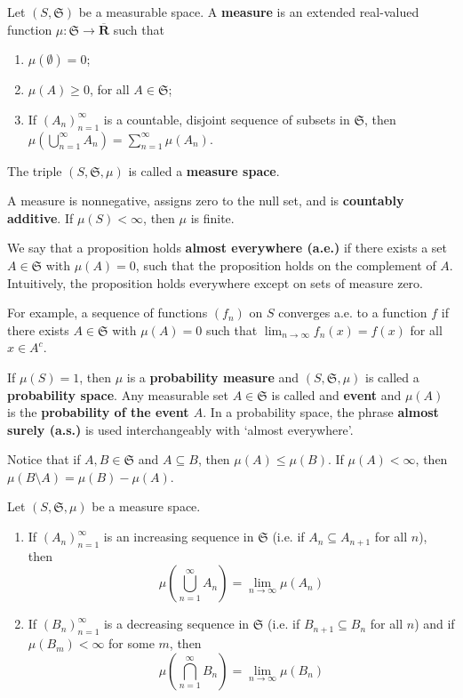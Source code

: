 \begin{definition}
	Let $(S, \mathfrak{S})$ be a measurable space. A \textbf{measure} is an extended real-valued function $\mu : \mathfrak{S} \longrightarrow \overline{\textbf{R}}$ such that 
	\begin{enumerate}
		\item $\mu ( \emptyset ) = 0$;
		\item $\mu(A) \geq 0$, for all $A \in \mathfrak{S}$;
		\item If $(A_n)_{n=1}^\infty$ is a countable, disjoint sequence of subsets in $\mathfrak{S}$, then $\mu(\bigcup_{n=1}^\infty A_n) = \sum_{n=1}^\infty \mu(A_n)$.
	\end{enumerate}

	The triple $(S, \mathfrak{S}, \mu)$ is called a \textbf{measure space}.
\end{definition}

A measure is nonnegative, assigns zero to the null set, and is \textbf{countably additive}. If $\mu(S) < \infty$, then $\mu$ is finite.

We say that a proposition holds \textbf{almost everywhere (a.e.)} if there exists a set $A \in \mathfrak{S}$ with $\mu(A) = 0$, such that the proposition holds on the complement of $A$. Intuitively, the proposition holds everywhere except on sets of measure zero.

For example, a sequence of functions $(f_n)$ on $S$ converges a.e. to a function $f$ if there exists $A \in \mathfrak{S}$ with $\mu(A) = 0$ such that $\lim_{n \to \infty} f_n(x) = f(x)$ for all $x \in A^c$.

If $\mu(S) = 1$, then $\mu$ is a \textbf{probability measure} and $(S, \mathfrak{S}, \mu)$ is called a \textbf{probability space}. Any measurable set $A \in \mathfrak{S}$ is called and \textbf{event} and $\mu(A)$ is the \textbf{probability of the event $A$}. In a probability space, the phrase \textbf{almost surely (a.s.)} is used interchangeably with `almost everywhere'.

Notice that if $A, B \in \mathfrak{S}$ and $A \subseteq B$, then $\mu(A) \leq \mu(B)$. If $\mu(A) < \infty$, then $\mu(B \setminus A) = \mu(B) - \mu(A)$.

\begin{theorem}
	Let $(S, \mathfrak{S}, \mu)$ be a measure space.
	\begin{enumerate}
		\item If $(A_n)_{n=1}^\infty$ is an increasing sequence in $\mathfrak{S}$ (i.e. if $A_n \subseteq A_{n+1}$ for all $n$), then \[ \mu \left( \bigcup_{n=1}^\infty A_n \right) = \lim_{n \to \infty} \mu(A_n) \] 
		\item If $(B_n)_{n=1}^\infty$ is a decreasing sequence in $\mathfrak{S}$ (i.e. if $B_{n+1} \subseteq B_n$ for all $n$) and if $\mu(B_m) < \infty$ for some $m$, then \[ \mu \left( \bigcap_{n=1}^\infty B_n \right) = \lim_{n \to \infty} \mu(B_n) \] 
	\end{enumerate}
\end{theorem}

